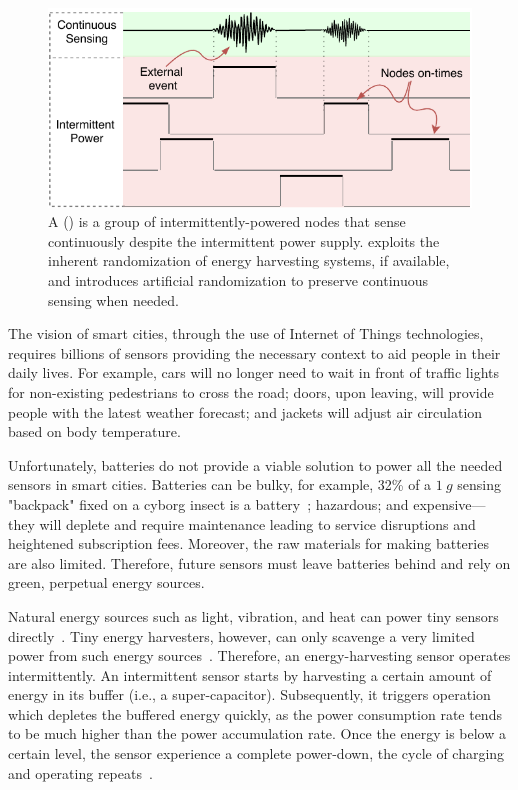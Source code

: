 \begin{figure}[t]
	\centering
	\includegraphics[width=\columnwidth]{figures/coalInterSen}
	\caption{A \fullsys (\sys) is a group of intermittently-powered nodes that sense continuously despite the intermittent power supply. \sys exploits the inherent randomization of energy harvesting systems, if available, and introduces artificial randomization to preserve continuous sensing when needed.}
	\label{fig:powerCycle}
\end{figure}
%
The vision of smart cities, through the use of Internet of Things technologies, requires billions of sensors providing the necessary context to aid people in their daily lives. For example, cars will no longer need to wait in front of traffic lights for non-existing pedestrians to cross the road; doors, upon leaving, will provide people with the latest weather forecast; and jackets will adjust air circulation based on body temperature. 

Unfortunately, batteries do not provide a viable solution to power all the needed sensors in smart cities. Batteries can be bulky, for example, 32\% of a $\SI{1}{g}$ sensing "backpack" fixed on a cyborg insect is a battery~\cite{daly2010pulsed}; hazardous; and expensive---they will deplete and require maintenance leading to service disruptions and heightened subscription fees. Moreover, the raw materials for making batteries are also limited. Therefore, future sensors must leave batteries behind and rely on green, perpetual energy sources. 

Natural energy sources such as light, vibration, and heat can power tiny sensors directly~\cite{margolies2016panda, gorlatova2014movers, gorlatova2010energy, gollakota2014emergence}. Tiny energy harvesters, however, can only scavenge a very limited power from such energy sources~\cite{liu2013ambient}. Therefore, an energy-harvesting sensor operates intermittently. An intermittent sensor starts by harvesting a certain amount of energy in its buffer (i.e., a super-capacitor). Subsequently, it triggers operation which depletes the buffered energy quickly, as the power consumption rate tends to be much higher than the power accumulation rate. Once the energy is below a certain level, the sensor experience a complete power-down, the cycle of charging and operating %
repeats~\cite{colin2018reconfigurable}.

